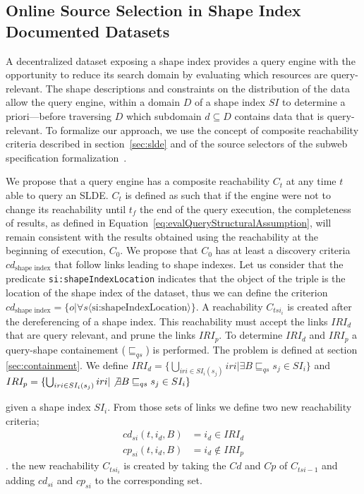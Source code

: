 \subsection{Online Source Selection in Shape Index Documented Datasets}

A decentralized dataset exposing a shape index provides a query engine with the opportunity to reduce its search domain by evaluating which resources are query-relevant.
The shape descriptions and constraints on the distribution of the data allow the query engine, 
within a domain $D$ of a shape index $SI$ to determine a priori—before traversing $D$ which subdomain $d \subseteq D$ contains data that is query-relevant.
To formalize our approach, we use the concept of composite reachability criteria described in section~\ref{sec:slde} and of the source selectors of the subweb specification formalization~\cite{Bogaerts2021LinkTW, Taelman2023}.

We propose that a query engine has a composite reachability $C_t$ at any time $t$ able to query an SLDE.
$C_t$ is defined as such that if the engine were not to change its reachability
until $t_f$ the end of the query execution, the completeness of results,
as defined in Equation~\ref{eq:evalQueryStructuralAssumption},
will remain consistent with the results obtained using the reachability at the beginning of execution, $C_{0}$.
We propose that $C_0$ has at least a discovery criteria $cd_{\text{shape index}}$ that follow links leading to shape indexes.
Let us consider that the predicate \texttt{si:shapeIndexLocation} indicates that the object of the triple is the location of the shape index 
of the dataset, thus we can define the criterion $cd_{\text{shape index}} = \{o|\forall s \langle \text{si:shapeIndexLocation} \rangle \}$.
A reachability $C_{tsi_i}$ is created after the dereferencing of a shape index.
This reachability must accept the links $IRI_d$ that are query relevant, and prune the links $IRI_p$.
To determine $IRI_d$ and $IRI_p$ a query-shape containement ($\sqsubseteq_{qs}$) is performed.
The problem is defined at section \ref{sec:containment}.
We define 
$IRI_d = \{ \bigcup_{iri \in SI_i(s_j)} iri | \exists B \sqsubseteq_{qs}  s_j \in SI_i \}$ and 
$IRI_p = \{ \bigcup_{iri \in SI_i(s_j)} iri | \not\exists B \sqsubseteq_{qs}  s_j \in SI_i \}$

given a shape index $SI_i$.
From those sets of links we define two new reachability criteria;
\begin{equation}
   \begin{aligned}
       cd_{si}(t, i_d, B) &= i_d \in IRI_d \\
       cp_{si}(t, i_d, B) &= i_d \notin IRI_p
   \end{aligned}
\end{equation}
.
the new reachability $C_{tsi_i}$ is created by taking the $Cd$ and $Cp$ of $C_{tsi - 1}$ and adding
$cd_{si}$ and $cp_{si}$ to the corresponding set. 


